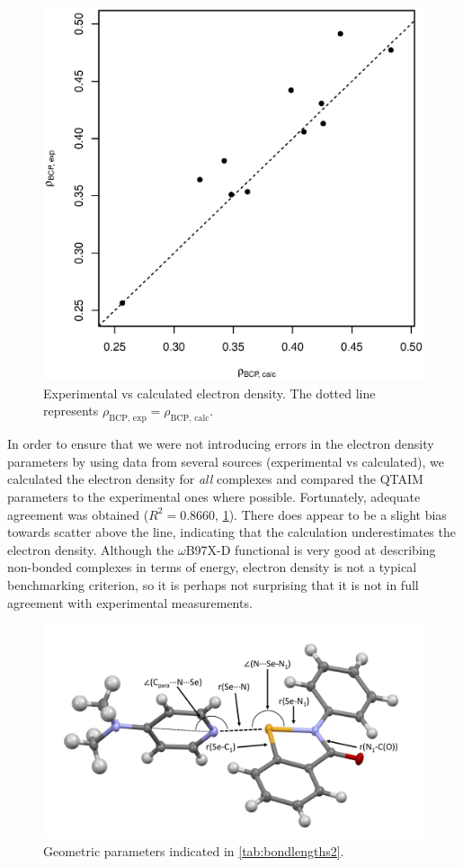 \begin{refsection}
\begin{figure}
  \includegraphics[width=0.6\linewidth]{Figures/rho-agreement.eps}
  \caption[Experimental vs calculated electron density.]{Experimental vs calculated electron density. The dotted line represents $\rho_\text{BCP, exp} = \rho_\text{BCP, calc}$.}\label{fig:qtaim-calc-exp}
\end{figure}

In order to ensure that we were not introducing errors in the electron density parameters by using data from several sources (experimental vs calculated), we calculated the electron density for \emph{all} complexes and compared the QTAIM parameters to the experimental ones where possible.
Fortunately, adequate agreement was obtained ($R^2 = 0.8660$, \cref{fig:qtaim-calc-exp}).
There does appear to be a slight bias towards scatter above the line, indicating that the calculation underestimates the electron density.
Although the $\omega$B97X-D functional is very good at describing non-bonded complexes in terms of energy, electron density is not a typical benchmarking criterion, so it is perhaps not surprising that it is not in full agreement with experimental measurements.


\begin{figure}
  \includegraphics[width=0.7\linewidth]{Figures/ebs-dmap-bondlengths.pdf}
  \caption{Geometric parameters indicated in \cref{tab:bondlengths2}.}\label{fig:ebs-dmap-bondlengths}
\end{figure}


\end{refsection}
